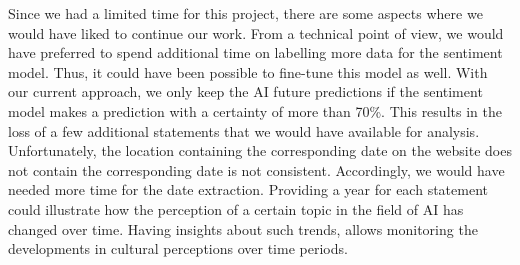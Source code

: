 Since we had a limited time for this project, there are some aspects where we would have liked to continue our work.
From a technical point of view, we would have preferred to spend additional time on labelling more data for the sentiment model.
Thus, it could have been possible to fine-tune this model as well.
With our current approach, we only keep the AI future predictions if the sentiment model makes a prediction with a certainty of more than 70\%. 
This results in the loss of a few additional statements that we would have available for analysis.
\\
Unfortunately, the location containing the corresponding date on the website does not contain the corresponding date is not consistent. 
Accordingly, we would have needed more time for the date extraction.
Providing a year for each statement could illustrate how the perception of a certain topic in the field of AI has changed over time.
Having insights about such trends, allows monitoring the developments in cultural perceptions over time periods.
\\





